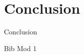 \documentclass[12pt, a4paper]{report}
\makeatletter
\let\plainappendixpage\appendixpage
\renewcommand{\appendixpage}{%
  \begingroup
  \let\ps@plain\ps@empty
  \plainappendixpage
  \endgroup}
\makeatother
\begin{document}
     
        
        
\chapter{{Conclusion}}
        
        {Conclusion}
        

        
\clearpage

{Bib Mod 1}


\clearpage




\end{document}
